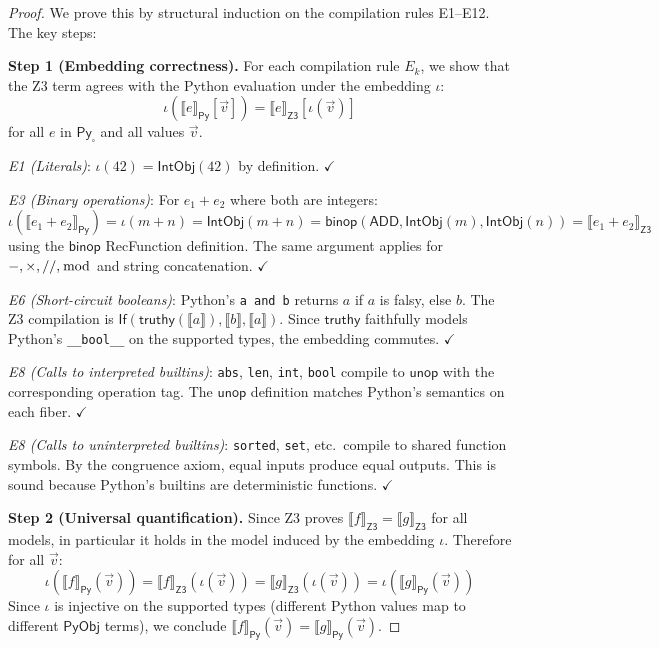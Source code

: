 \documentclass[11pt,a4paper]{report}
\theoremstyle{definition}
\theoremstyle{plain}
\newcommand{\den}[1]{\llbracket #1 \rrbracket}
\newcommand{\PyObj}{\mathsf{PyObj}}
\begin{document}
\begin{proof}
We prove this by structural induction on the compilation rules
E1--E12.  The key steps:

\textbf{Step 1 (Embedding correctness).}  For each compilation
rule $E_k$, we show that the Z3 term agrees with the Python
evaluation under the embedding $\iota$:
\[
  \iota(\den{e}_\mathsf{Py}[\vec{v}]) =
    \den{e}_\mathsf{Z3}[\iota(\vec{v})]
\]
for all $e$ in $\mathsf{Py}_\square$ and all values $\vec{v}$.

\emph{E1 (Literals)}: $\iota(42) = \mathsf{IntObj}(42)$ by
definition.  $\checkmark$

\emph{E3 (Binary operations)}: For $e_1 + e_2$ where both are
integers:
\[
  \iota(\den{e_1 + e_2}_\mathsf{Py}) = \iota(m + n)
    = \mathsf{IntObj}(m + n)
    = \mathsf{binop}(\mathsf{ADD}, \mathsf{IntObj}(m),
      \mathsf{IntObj}(n))
    = \den{e_1 + e_2}_\mathsf{Z3}
\]
using the $\mathsf{binop}$ RecFunction definition.  The same
argument applies for $-, \times, //, \bmod$ and string
concatenation.  $\checkmark$

\emph{E6 (Short-circuit booleans)}: Python's \texttt{a and b}
returns $a$ if $a$ is falsy, else $b$.  The Z3 compilation is
$\mathsf{If}(\mathsf{truthy}(\den{a}), \den{b}, \den{a})$.
Since $\mathsf{truthy}$ faithfully models Python's
\texttt{\_\_bool\_\_} on the supported types,
the embedding commutes.  $\checkmark$

\emph{E8 (Calls to interpreted builtins)}: \texttt{abs},
\texttt{len}, \texttt{int}, \texttt{bool} compile to
$\mathsf{unop}$ with the corresponding operation tag.  The
$\mathsf{unop}$ definition matches Python's semantics on each
fiber.  $\checkmark$

\emph{E8 (Calls to uninterpreted builtins)}: \texttt{sorted},
\texttt{set}, etc.\ compile to shared function symbols.  By the
congruence axiom, equal inputs produce equal outputs.  This is
sound because Python's builtins are deterministic functions.
$\checkmark$

\textbf{Step 2 (Universal quantification).}  Since Z3 proves
$\den{f}_\mathsf{Z3} = \den{g}_\mathsf{Z3}$ for all models,
in particular it holds in the model induced by the embedding
$\iota$.  Therefore for all $\vec{v}$:
\[
  \iota(\den{f}_\mathsf{Py}(\vec{v}))
    = \den{f}_\mathsf{Z3}(\iota(\vec{v}))
    = \den{g}_\mathsf{Z3}(\iota(\vec{v}))
    = \iota(\den{g}_\mathsf{Py}(\vec{v}))
\]
Since $\iota$ is injective on the supported types (different
Python values map to different $\PyObj$ terms), we conclude
$\den{f}_\mathsf{Py}(\vec{v}) = \den{g}_\mathsf{Py}(\vec{v})$.
\end{proof}
\end{document}
